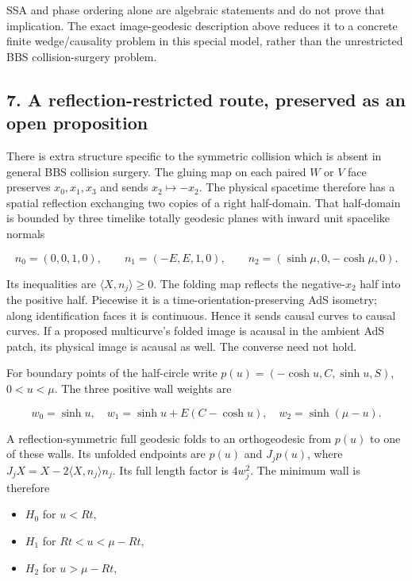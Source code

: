 \documentclass[11pt]{article}
\providecommand{\tightlist}{\setlength{\itemsep}{1pt}\setlength{\parskip}{0pt}}
\begin{document}
SSA and phase ordering alone are algebraic statements and do not prove
that implication. The exact image-geodesic description above reduces it
to a concrete finite wedge/causality problem in this special model,
rather than the unrestricted BBS collision-surgery problem.

\subsection{7. A reflection-restricted route, preserved as an open
proposition}\label{a-reflection-restricted-route-preserved-as-an-open-proposition}

There is extra structure specific to the symmetric collision which is
absent in general BBS collision surgery. The gluing map on each paired
\(W\) or \(V\) face preserves \(x_0,x_1,x_3\) and sends
\(x_2\mapsto-x_2\). The physical spacetime therefore has a spatial
reflection exchanging two copies of a right half-domain. That
half-domain is bounded by three timelike totally geodesic planes with
inward unit spacelike normals

\[
 n_0=(0,0,1,0),\qquad
 n_1=(-E,E,1,0),\qquad
 n_2=(\sinh\mu,0,-\cosh\mu,0).
\]

Its inequalities are \(\langle X,n_j\rangle\ge0\). The folding map
reflects the negative-\(x_2\) half into the positive half. Piecewise it
is a time-orientation-preserving AdS isometry; along identification
faces it is continuous. Hence it sends causal curves to causal curves.
If a proposed multicurve's folded image is acausal in the ambient AdS
patch, its physical image is acausal as well. The converse need not
hold.

For boundary points of the half-circle write
\(p(u)=(-\cosh u,C,\sinh u,S)\), \(0<u<\mu\). The three positive wall
weights are

\[
 w_0=\sinh u,\quad
 w_1=\sinh u+E(C-\cosh u),\quad
 w_2=\sinh(\mu-u).
\]

A reflection-symmetric full geodesic folds to an orthogeodesic from
\(p(u)\) to one of these walls. Its unfolded endpoints are \(p(u)\) and
\(J_jp(u)\), where \(J_jX=X-2\langle X,n_j\rangle n_j\). Its full length
factor is \(4w_j^2\). The minimum wall is therefore

\begin{itemize}
\tightlist
\item
  \(H_0\) for \(u<Rt\),
\item
  \(H_1\) for \(Rt<u<\mu-Rt\),
\item
  \(H_2\) for \(u>\mu-Rt\),
\end{itemize}
\end{document}

